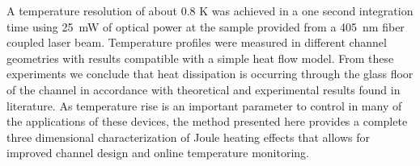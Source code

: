 \documentclass[9pt,twocolumn,twoside]{osajnl}
\begin{document}
 A temperature resolution of about 0.8 K was achieved in a one second integration time using 25~mW of optical power at the sample provided from a 405~nm fiber coupled laser beam. Temperature profiles were measured in different channel geometries with results compatible with a simple heat flow model. From these experiments we conclude that heat dissipation is occurring through the glass floor of the channel in accordance with theoretical and experimental results found in literature. As temperature rise is an important parameter to control in many of the applications of these devices, the method presented here provides a complete three dimensional characterization of Joule heating effects that allows for improved channel design and online temperature monitoring.






\end{document}
